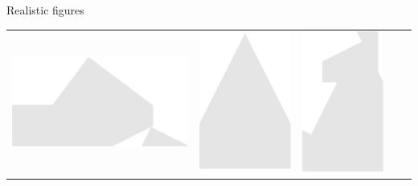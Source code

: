 \documentclass[14pt]{beamer}
\begin{document}
\begin{frame}{Realistic figures}
\begin{center}
{\begin{tabular}{ccccc}
                \includegraphics[scale=0.21]{figures/figure026b.pdf} &
                \includegraphics[scale=0.21]{figures/figure026e.pdf} &
                \includegraphics[scale=0.21]{figures/figure026h.pdf} \\

\end{tabular}}
\end{center}
\end{frame}
\end{document}
